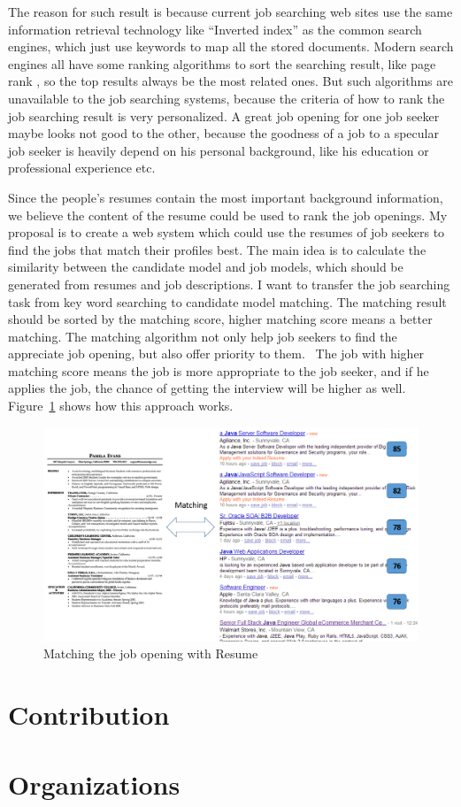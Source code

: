 The reason for such result is because current job searching web sites use the same information retrieval technology like ``Inverted index'' \cite{zobel2006inverted} as the common search engines, which just use keywords to map all the stored documents. Modern search engines all have some ranking algorithms to sort the searching result, like page rank \cite{page1999pagerank}, so the top results always be the most related ones. But such algorithms are unavailable to the job searching systems, because the criteria  of how to rank the job searching result is very personalized. A great job opening for one job seeker maybe looks not good to the other, because the goodness of a job to a specular job seeker is heavily depend on his personal background, like his education or professional experience etc.

Since the people's resumes contain the most important background information, we believe the content of the resume could be used to rank the job openings. My proposal is to create a web system which could use the resumes of job seekers to find the jobs that match their profiles best. The main idea is to calculate the similarity between the candidate model and job models, which should be generated from resumes and job descriptions. I want to transfer the job searching task from key word searching to candidate model matching. The matching result should be sorted by the matching score, higher matching score means a better matching. The matching algorithm not only help job seekers to find the appreciate job opening, but also offer priority to them.~\cite{gueutal2006brave}  The job with higher matching score means the job is more appropriate to the job seeker, and if he applies the job, the chance of getting the interview will be higher as well. Figure~\ref{fig:Matching} shows how this approach works.


\begin{figure}[htbp]
  \centering
  \includegraphics[scale=0.5]{images/matching.png}
  \caption{Matching the job opening with Resume}
  \label{fig:Matching}
\end{figure}

\section{Contribution}

\section{Organizations}
